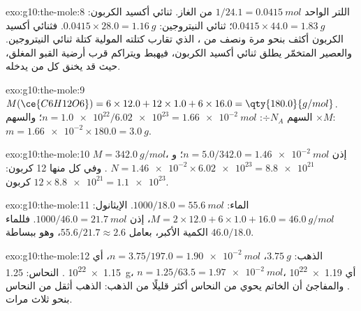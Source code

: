\begin{solution}{exo:g10:the-mole:8}
اللتر الواحد $1/24.1 = \qty{0.0415}{mol}$ من الغاز. ثنائي أكسيد الكربون:
$0.0415 \times 44.0 = \qty{1.83}{g}$؛ ثنائي النيتروجين:
$0.0415 \times 28.0 = \qty{1.16}{g}$. فثنائي أكسيد الكربون أكثف بنحو مرة
ونصف من ، الذي تقارب كتلته المولية كتلة ثنائي
النيتروجين. والعصير المتخمّر يطلق ثنائي أكسيد الكربون، فيهبط ويتراكم قرب أرضية
القبو المغلق، حيث قد يخنق كل من يدخله.
\end{solution}

\begin{solution}{exo:g10:the-mole:9}
$M(\ce{C6H12O6}) = 6 \times 12.0 + 12 \times 1.0 + 6 \times 16.0 =
\qty{180.0}{g/mol}$. السهم $\div N_A$: $n = \num{1.0e22} / \num{6.02e23} =
\qty{1.66e-2}{mol}$؛ والسهم $\times M$: $m = \num{1.66e-2} \times 180.0 =
\qty{3.0}{g}$.
\end{solution}

\begin{solution}{exo:g10:the-mole:10}
$M = \qty{342.0}{g/mol}$، إذن $n = 5.0 / 342.0 = \qty{1.46e-2}{mol}$؛
و$N = \num{1.46e-2} \times \num{6.02e23} = \num{8.8e21}$ . وفي كل
منها 12  كربون: $12 \times \num{8.8e21} = \num{1.1e23}$  كربون.
\end{solution}

\begin{solution}{exo:g10:the-mole:11}
الماء: $1000 / 18.0 = \qty{55.6}{mol}$. الإيثانول:
$M = 2 \times 12.0 + 6 \times 1.0 + 16.0 = \qty{46.0}{g/mol}$، إذن
$1000 / 46.0 = \qty{21.7}{mol}$. فللماء الكمية الأكبر، بعامل
$55.6 / 21.7 \approx 2.6$، وهو ببساطة $46.0 / 18.0$.
\end{solution}

\begin{solution}{exo:g10:the-mole:12}
الذهب: $\qty{3.75}{g}$، $n = 3.75 / 197.0 = \qty{1.90e-2}{mol}$، أي
\num{1.15e22} . النحاس: \qty{1.25}{g}،
$n = 1.25 / 63.5 = \qty{1.97e-2}{mol}$، أي \num{1.19e22} .
والمفاجئ أن الخاتم يحوي من  النحاس أكثر قليلًا من  الذهب:
 الذهب أثقل من  النحاس بنحو ثلاث مرات.
\end{solution}

